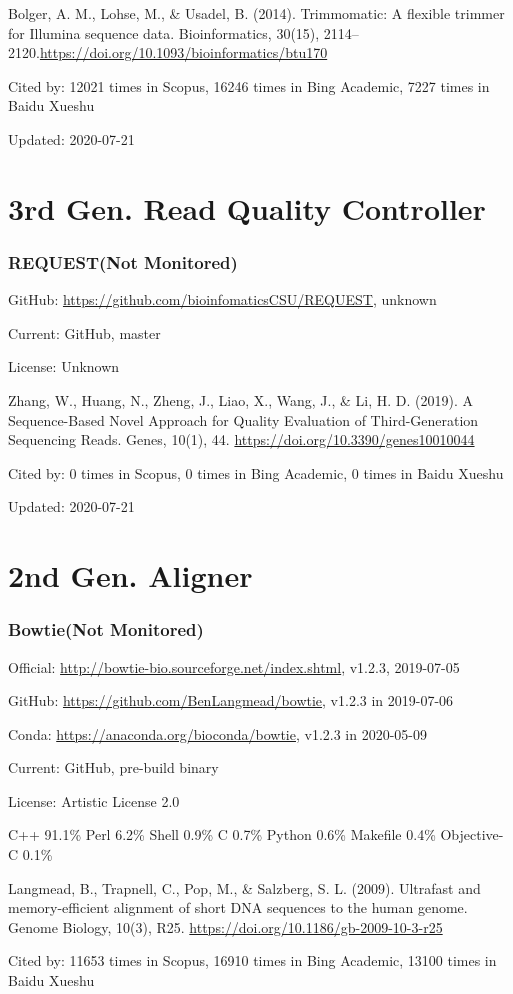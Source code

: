 \documentclass[]{article}
\newcommand{\nm}{{\color{red}(Not Monitored)}}
\newcommand{\cb}[3]{\par Cited by: {\color{blue}\Huge #1} times in Scopus, {\color{blue}\Huge #2} times in Bing Academic, {\color{blue}\Huge #3} times in Baidu Xueshu}
\begin{document}
Bolger, A. M., Lohse, M., \& Usadel, B. (2014). Trimmomatic: A flexible trimmer for Illumina sequence data. Bioinformatics, 30(15), 2114–2120.\url{https://doi.org/10.1093/bioinformatics/btu170} \cb{12021}{16246}{7227}

Updated: 2020-07-21

\part{3rd Gen. Read Quality Controller}

\section{REQUEST\nm}

GitHub: \url{https://github.com/bioinfomaticsCSU/REQUEST}, unknown

Current: GitHub, master

License: Unknown

Zhang, W., Huang, N., Zheng, J., Liao, X., Wang, J., \& Li, H. D. (2019). A Sequence-Based Novel Approach for Quality Evaluation of Third-Generation Sequencing Reads. Genes, 10(1), 44. \url{https://doi.org/10.3390/genes10010044}\cb{0}{0}{0}

Updated: 2020-07-21

\part{2nd Gen. Aligner}
\section{Bowtie\nm}

Official: \url{http://bowtie-bio.sourceforge.net/index.shtml}, v1.2.3, 2019-07-05

GitHub: \url{https://github.com/BenLangmead/bowtie}, v1.2.3 in 2019-07-06

Conda: \url{https://anaconda.org/bioconda/bowtie}, v1.2.3 in 2020-05-09

Current: GitHub, pre-build binary

License: Artistic License 2.0

C++ 91.1\% Perl 6.2\% Shell 0.9\% C 0.7\% Python 0.6\% Makefile 0.4\% Objective-C 0.1\%

Langmead, B., Trapnell, C., Pop, M., \& Salzberg, S. L. (2009). Ultrafast and memory-efficient alignment of short DNA sequences to the human genome. Genome Biology, 10(3), R25. \url{https://doi.org/10.1186/gb-2009-10-3-r25} \cb{11653}{16910}{13100}
\end{document}
